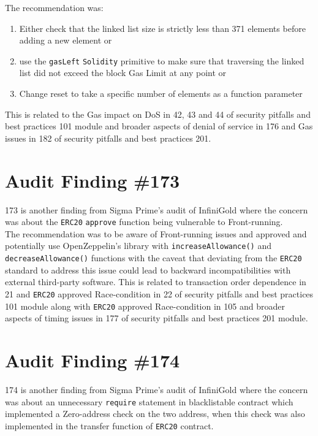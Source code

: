 The recommendation was:
    \begin{enumerate}
    \item Either check that the linked list size is strictly less than 371 elements before adding a new element or
    \item use the \verb|gasLeft| \verb|Solidity| primitive to make sure that traversing the linked list did not exceed the block Gas Limit at any point or
    \item Change reset to take a specific number of elements as a function parameter
    \end{enumerate}
This is related to the Gas impact on DoS in 42, 43 and 44 of security pitfalls and best practices 101 module and broader aspects of denial of service in 176 and Gas issues in 182 of security pitfalls and best practices 201.

\section{Audit Finding \#173}

173 is another finding from Sigma Prime's audit of InfiniGold where the concern was about the \verb|ERC20| \verb|approve| function being vulnerable to Front-running.\\

The recommendation was to be aware of Front-running issues and approved and potentially use OpenZeppelin's library with \verb|increaseAllowance()| and \verb|decreaseAllowance()| functions with the caveat that deviating from the \verb|ERC20| standard to address this issue could lead to backward incompatibilities with external third-party software. This is related to transaction order dependence in 21 and \verb|ERC20| approved Race-condition in 22 of security pitfalls and best practices 101 module along with \verb|ERC20| approved Race-condition in 105 and broader aspects of timing issues in 177 of security pitfalls and best practices 201 module.

\section{Audit Finding \#174}

174 is another finding from Sigma Prime's audit of InfiniGold where the concern was about an unnecessary \verb|require| statement in blacklistable contract which implemented a Zero-address check on the two address, when this check was also implemented in the transfer function of \verb|ERC20| contract.\\

